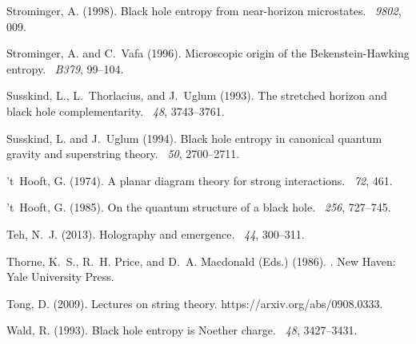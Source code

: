 \documentclass{article}
\begin{document}
\begin{thebibliography}{}
Strominger, A. (1998).
\newblock Black hole entropy from near-horizon microstates.
~{\em 9802}, 009.

Strominger, A. and C.~Vafa (1996).
\newblock Microscopic origin of the {B}ekenstein-{H}awking entropy.
~{\em B379}, 99--104.

Susskind, L., L.~Thorlacius, and J.~Uglum (1993).
\newblock The stretched horizon and black hole complementarity.
~{\em 48}, 3743--3761.

Susskind, L. and J.~Uglum (1994).
\newblock Black hole entropy in canonical quantum gravity and superstring
  theory.
~{\em 50}, 2700--2711.

't~Hooft, G. (1974).
\newblock A planar diagram theory for strong interactions.
~{\em 72}, 461.

't~Hooft, G. (1985).
\newblock On the quantum structure of a black hole.
~{\em 256}, 727--745.

Teh, N.~J. (2013).
\newblock Holography and emergence.
~{\em 44},
  300--311.

Thorne, K.~S., R.~H. Price, and D.~A. Macdonald (Eds.) (1986).
.
\newblock New Haven: Yale University Press.

Tong, D. (2009).
\newblock Lectures on string theory.
\newblock https://arxiv.org/abs/0908.0333.

Wald, R. (1993).
\newblock Black hole entropy is {N}oether charge.
~{\em 48}, 3427--3431.


\end{thebibliography}
\end{document}
